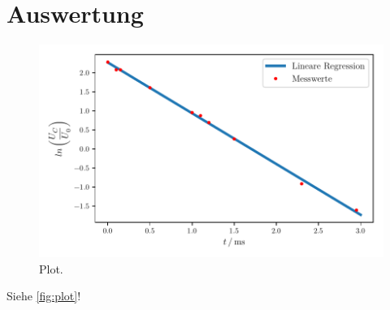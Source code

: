\section{Auswertung}
\label{sec:Auswertung}

\begin{figure}
  \centering
  \includegraphics{plot.pdf}
  \caption{Plot.}
  \label{fig:plot}
\end{figure}


Siehe \autoref{fig:plot}!

